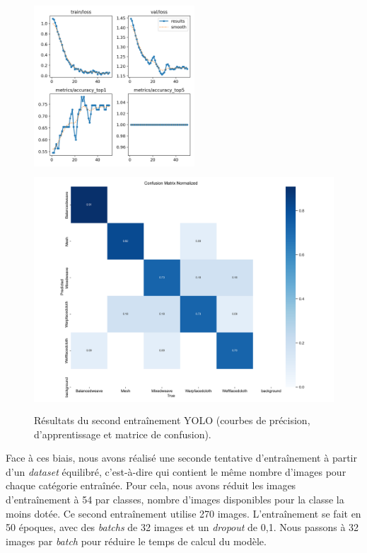 \begin{figure}[!h]
    \begin{minipage}[c]{.4\linewidth}
            \begin{center}
                \includegraphics[height=6cm]{../images/YOLO_50epoch_eq.png}
            \end{center}
    \end{minipage}
        \begin{minipage}[c]{.6\linewidth}
        \begin{center}
        		\includegraphics[height=9cm]{../images/YOLO_50epoch_eq_confusion_matrix_normalized.png}
	\end{center}
    \end{minipage}
    \caption{Résultats du second entraînement YOLO (courbes de précision, d'apprentissage et matrice de confusion).}
    \label{fig:YOLO_eq}   
\end{figure}

Face à ces biais, nous avons réalisé une seconde tentative d'entraînement à partir d'un \textit{dataset} équilibré, c'est-à-dire qui contient le même nombre d'images pour chaque catégorie entraînée. Pour cela, nous avons réduit les images d'entraînement à 54 par classes, nombre d'images disponibles pour la classe la moins dotée. Ce second entraînement utilise 270 images. L'entraînement se fait en 50 époques, avec des \textit{batchs} de 32 images et un \textit{dropout} de 0,1. Nous passons à 32 images par \textit{batch} pour réduire le temps de calcul du modèle.

